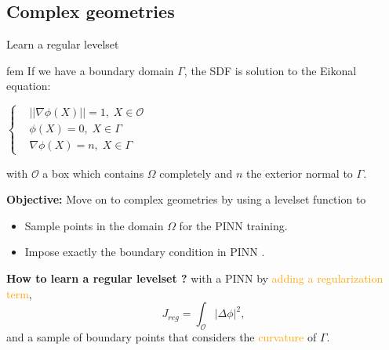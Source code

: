 \subsection{Complex geometries}

\begin{frame}{Learn a regular levelset}		
    \vspace{-10pt}
    \hypersetup{
		citecolor=white,
	}

    \begin{mytheo}{\footnotesize\citep{clemot_neural_2023}\normalsize}{fem}
		If we have a boundary domain $\Gamma$, the SDF is solution to the Eikonal equation:
		
		\begin{minipage}{0.7\linewidth}
			\hspace{100pt}
			$\left\{\begin{aligned}
				&||\nabla\phi(X)||=1, \; X\in\mathcal{O} \\
				&\phi(X)=0, \; X\in\Gamma \\
				&\nabla\phi(X)=n, \; X\in\Gamma
			\end{aligned}\right.$
		\end{minipage}
		\begin{minipage}{0.25\linewidth}
			\centering
		\end{minipage}
		
		with $\mathcal{O}$ a box which contains $\Omega$ completely and $n$ the exterior normal to $\Gamma$.
	\end{mytheo}

    \hypersetup{
        citecolor=other,
    }

    \vspace{5pt}

    \textbf{Objective:} Move on to complex geometries by using a levelset function to

    \begin{itemize}
        \item Sample points in the domain $\Omega$ for the PINN training.
        \item Impose exactly the boundary condition in PINN \citep{Sukumar_2022}.
    \end{itemize}

    \vspace{5pt}

	\textbf{How to learn a regular levelset ?} with a PINN by \textcolor{orange}{adding a regularization term},
	\vspace{-5pt}
	\begin{equation*}
		J_{reg} = \int_\mathcal{O} |\Delta\phi|^2,
	\end{equation*}
    and a sample of boundary points that considers the \textcolor{orange}{curvature} of $ \Gamma$. \filledstar

\end{frame}

